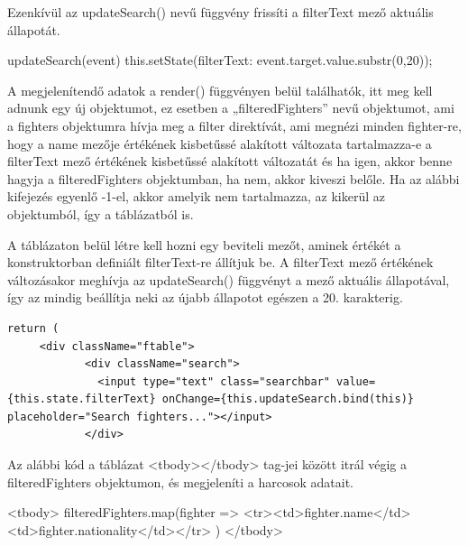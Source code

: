 Ezenkívül az updateSearch() nevű függvény frissíti a filterText mező aktuális állapotát.

\begin{cpp}
updateSearch(event){
    this.setState({filterText: event.target.value.substr(0,20)}); }
\end{cpp}

A megjelenítendő adatok a render() függvényen belül találhatók, itt meg kell adnunk egy új objektumot, ez esetben a „filteredFighters” nevű objektumot, ami a fighters objektumra hívja meg a filter direktívát, ami megnézi minden fighter-re, hogy a name mezője értékének kisbetűssé alakított változata tartalmazza-e a filterText mező értékének kisbetűssé alakított változatát és ha igen, akkor benne hagyja a filteredFighters objektumban, ha nem, akkor kiveszi belőle. Ha az alábbi kifejezés egyenlő -1-el, akkor amelyik nem tartalmazza, az kikerül az objektumból, így a táblázatból is.

\begin{cpp}
render() {
    let filteredFighters = this.state.fighters.filter(
        (fighter) => {
          return fighter.name.toLowerCase().indexOf(this.state.filterText.toLowerCase()) !== -1;
        }
      );
\end{cpp}

A táblázaton belül létre kell hozni egy beviteli mezőt, aminek értékét a konstruktorban definiált filterText-re állítjuk be. A filterText mező értékének változásakor meghívja az
updateSearch() függvényt a mező aktuális állapotával, így az mindig beállítja neki az újabb állapotot egészen a 20. karakterig.

\begin{verbatim}
return (
     <div className="ftable">
            <div className="search">
              <input type="text" class="searchbar" value={this.state.filterText} onChange={this.updateSearch.bind(this)} placeholder="Search fighters..."></input>
            </div>
\end{verbatim}

Az alábbi kód a táblázat <tbody></tbody> tag-jei között itrál végig a filteredFighters objektumon, és megjeleníti a harcosok adatait.

\begin{cpp}
<tbody>
                {filteredFighters.map(fighter =>
                  <tr><td>{fighter.name}</td><td>{fighter.nationality}</td></tr>
                )}
              </tbody>
\end{cpp}



